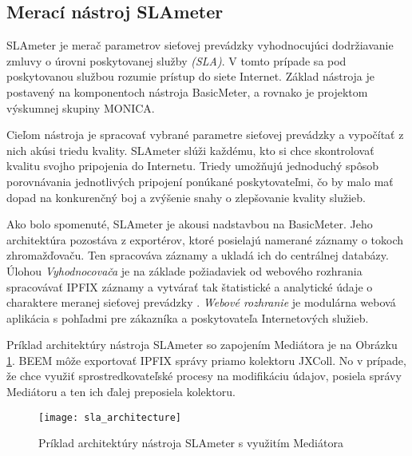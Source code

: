 \subsection{Merací nástroj SLAmeter}

SLAmeter je merač parametrov sieťovej prevádzky vyhodnocujúci dodržiavanie zmluvy o úrovni poskytovanej 
služby \emph{(SLA)}. V tomto prípade sa pod poskytovanou službou rozumie prístup do siete 
Internet. Základ nástroja je postavený na komponentoch nástroja BasicMeter, a rovnako je projektom 
výskumnej skupiny MONICA. 

Cieľom nástroja je spracovať vybrané parametre sieťovej prevádzky a vypočítať z nich akúsi triedu 
kvality. SLAmeter slúži každému, kto si chce skontrolovať kvalitu svojho pripojenia do Internetu. 
Triedy umožňujú jednoduchý spôsob porovnávania jednotlivých pripojení ponúkané poskytovateľmi, 
čo by malo mať dopad na konkurenčný boj a zvýšenie snahy o zlepšovanie kvality služieb. \citep{slameter}

Ako bolo spomenuté, SLAmeter je akousi nadstavbou na BasicMeter. Jeho architektúra pozostáva z exportérov,
ktoré posielajú namerané záznamy o tokoch zhromažďovaču. Ten spracováva záznamy a ukladá ich do 
centrálnej databázy. Úlohou \emph{Vyhodnocovača} je na základe požiadaviek od webového rozhrania 
spracovávať IPFIX záznamy a vytvárať tak štatistické a analytické údaje o charaktere 
meranej sieťovej prevádzky \citep{evaluator}. \emph{Webové rozhranie} je modulárna webová aplikácia 
s pohľadmi pre zákazníka a poskytovateľa Internetových služieb.

Príklad architektúry nástroja SLAmeter so zapojením Mediátora je na Obrázku \ref{o:sla_architecture}.
BEEM môže exportovať IPFIX správy priamo kolektoru JXColl. No v prípade, že chce využiť sprostredkovateľské 
procesy na modifikáciu údajov, posiela správy Mediátoru a ten ich ďalej preposiela kolektoru.

\begin{figure}[ht!]
\centering
\texttt{[image: sla\_architecture]}
\caption{Príklad architektúry nástroja SLAmeter s využitím Mediátora}\label{o:sla_architecture}
\end{figure}